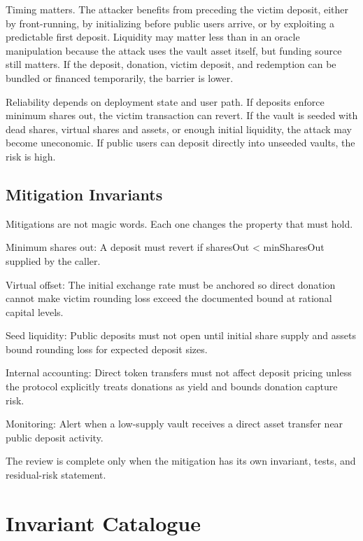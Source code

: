 Timing matters. The attacker benefits from preceding the victim deposit, either by front-running, by initializing before public users arrive, or by exploiting a predictable first deposit. Liquidity may matter less than in an oracle manipulation because the attack uses the vault asset itself, but funding source still matters. If the deposit, donation, victim deposit, and redemption can be bundled or financed temporarily, the barrier is lower.

Reliability depends on deployment state and user path. If deposits enforce minimum shares out, the victim transaction can revert. If the vault is seeded with dead shares, virtual shares and assets, or enough initial liquidity, the attack may become uneconomic. If public users can deposit directly into unseeded vaults, the risk is high.

\subsection{Mitigation Invariants}

Mitigations are not magic words. Each one changes the property that must hold.

\begin{codeblock}
Minimum shares out:
    A deposit must revert if sharesOut < minSharesOut supplied by the caller.

Virtual offset:
    The initial exchange rate must be anchored so direct donation cannot
    make victim rounding loss exceed the documented bound at rational
    capital levels.

Seed liquidity:
    Public deposits must not open until initial share supply and assets
    bound rounding loss for expected deposit sizes.

Internal accounting:
    Direct token transfers must not affect deposit pricing unless the
    protocol explicitly treats donations as yield and bounds donation
    capture risk.

Monitoring:
    Alert when a low-supply vault receives a direct asset transfer near
    public deposit activity.
\end{codeblock}

The review is complete only when the mitigation has its own invariant, tests, and residual-risk statement.

\section{Invariant Catalogue}

